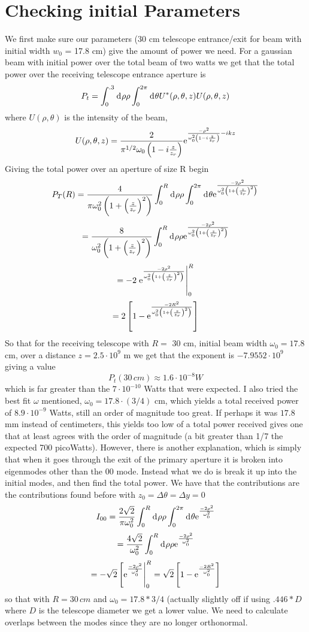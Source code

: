 \documentclass[11pt]{amsart}
\makeatletter
\newcommand{\e}{{\rm e}}				%
\newcommand{\msp}[1]{\mspace{#1mu}}		%
\newcommand{\0}{\varnothing}		%
\newcommand{\apr}{\approx}		%
\newcommand{\ti}{\cdot}			%
\newcommand{\dd}{\msp{1} {\rm{d}} \msp{1}}	%
\newcommand{\1}{!}
\newcommand{\2}{@}
\newcommand{\3}{\#}
\newcommand{\4}{\$}
\newcommand{\5}{\%}
\newcommand{\6}{$^\wedge$}
\newcommand{\7}{\&}
\newcommand{\8}{*}
\newcommand{\9}{(}
\makeatother
\begin{document}
\section{Checking initial Parameters}
We first make sure our parameters (30 cm telescope entrance/exit for beam with initial width $w_0$ = 17.8 cm) give the amount of power we need. For a gaussian beam with initial power over the total beam of two watts we get that the total power over the receiving telescope entrance aperture is
\[
P_t = \int_0^{.3} \dd \rho \rho \int_0^{2\pi} \dd \theta U^*(\rho,\theta,z)U(\rho,\theta,z)
\]
where $U(\rho,\theta)$ is the intensity of the beam, 
\[
U(\rho,\theta,z) = \frac{2}{\pi^{1/2}\omega_0\left(1-i\frac{z}{z_r}\right)}\e^{\frac{-\rho^2}{\omega_0^2\left(1-i\frac{z}{z_r}\right)}-ikz}
\]
Giving the total power over an aperture of size R begin
\[
P_T(R) = \frac{4}{\pi \omega_0^2 \left(1+\left(\frac{z}{z_r}\right)^2\right)}\int_0^R\dd \rho \rho \int_0^{2\pi} \dd \theta\e^{\frac{-2\rho^2}{\omega_0^2\left(1+\left(\frac{z}{z_r}\right)^2\right)}}
\]
\[
=\frac{8}{\omega_0^2\left(1+\left(\frac{z}{z_r}\right)^2\right)}\int_0^R \dd \rho \rho\e^{\frac{-2\rho^2}{\omega_0^2\left(1+\left(\frac{z}{z_r}\right)^2\right)}}
\]
\[
=-2\left.\e^{\frac{-2\rho^2}{\omega_0^2\left(1+\left(\frac{z}{z_r}\right)^2\right)}}\right|_0^R
\]
\[
=2\left[1-\e^{\frac{-2R^2}{\omega_0^2\left(1+\left(\frac{z}{z_r}\right)^2\right)}}\right]
\]
So that for the receiving telescope with $R =$ 30 cm, initial beam width $\omega_0 = 17.8$ cm, over a distance $z = 2.5\ti 10^9$ m we get  that the exponent is $-7.9552\ti 10^9$ giving a value
\[
P_t(30\,cm) \apr 1.6\ti 10^{-8} W
\]
which is far greater than the $7\ti 10^{-10}$ Watts that were expected. I also tried the best fit $\omega$ mentioned, $\omega_0 = 17.8\ti(3/4)$ cm,  which yields a total received power of $8.9\ti 10^{-9}$ Watts, still an order of magnitude too great. If perhaps it was $17.8$ mm instead of centimeters, this yields too low of a total power received gives one that at least agrees with the order of magnitude (a bit greater than 1/7 the expected 700 picoWatts). However, there is another explanation, which is simply that when it goes through the exit of the primary aperture it is broken into eigenmodes other than the 00 mode. Instead what we do is break it up into the initial modes, and then find the total power. We have that the contributions are the contributions found before with $z_0=\Delta \theta = \Delta y = 0$
\[
I_{00} = \frac{2\sqrt{2}}{\pi\omega_0^2}\int_0^{R}\dd \rho \rho\int_0^{2\pi} \dd \theta \e^{\frac{-2\rho^2}{\omega_0^2}}
\]
\[
=\frac{4\sqrt{2}}{\omega_0^2}\int_0^R\dd \rho \rho \e^{\frac{-2\rho^2}{\omega_0^2}}
\]
\[
=-\sqrt{2}\left[\e^{\frac{-2\rho^2}{\omega_0^2}}\right|_0^R  = \sqrt{2}\left[1-\e^{\frac{-2R^2}{\omega_0^2}}\right]
\]
so that with $R = 30\,cm$ and $\omega_0=17.8*3/4$ (actually slightly off if using $.446*D$ where $D$ is the telescope diameter we get a lower value. We need to calculate overlaps between the modes since they are no longer orthonormal.
\end{document}
